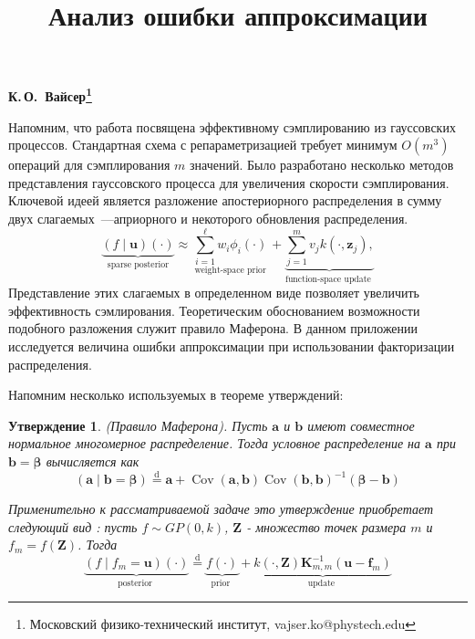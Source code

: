 \documentclass[12pt, twoside]{article}
\newcommand{\ba}{{\mathbf{a}}}
\newcommand{\bb}{{\mathbf{b}}}
\newcommand{\bZ}{{\mathbf{Z}}}
\newtheorem{corollary}{Утверждение}
\begin{document}
\title{\textbf{Анализ ошибки аппроксимации}}

\maketitle
\begin{center}
\bf
 К.\,О.~Вайсер\footnote{Московский физико-технический институт, vajser.ko@phystech.edu} 
\end{center}



Напомним, что работа посвящена эффективному сэмплированию из гауссовских процессов. Стандартная схема с репараметризацией требует минимум $O(m^3)$ операций для сэмплирования $m$ значений. Было разработано несколько методов представления гауссовского процесса для увеличения скорости сэмплирования. Ключевой идеей является разложение апостериорного распределения в сумму двух слагаемых~---априорного и некоторого обновления распределения. 
\begin{equation}
\underset{\text { sparse posterior }}{\underbrace{(f \mid \boldsymbol{u})(\cdot)}} \approx \underset{\text { weight-space prior }}{\sum_{i=1}^{\ell} w_{i} \phi_{i}(\cdot)}+\underbrace{\sum_{j=1}^{m} v_{j} k\left(\cdot, \boldsymbol{z}_{j}\right),}_{\text {function-space update }}
\end{equation}
Представление этих слагаемых в определенном виде позволяет увеличить эффективность сэмлирования. Теоретическим обоснованием возможности подобного разложения служит правило Маферона. В данном приложении исследуется величина ошибки аппроксимации при использовании факторизации распределения.  

Напомним несколько используемых в теореме утверждений:
\begin{corollary}


(Правило Маферона). Пусть $\ba$ и $\bb$ имеют совместное нормальное многомерное распределение. Тогда условное распределение на $\ba$ при $\bb = \mathbf{\beta}$ вычисляется как 
\begin{equation}
(\boldsymbol{a} \mid \boldsymbol{b}=\boldsymbol{\beta}) \stackrel{\mathrm{d}}{=} \boldsymbol{a}+\operatorname{Cov}(\boldsymbol{a}, \boldsymbol{b}) \operatorname{Cov}(\boldsymbol{b}, \boldsymbol{b})^{-1}(\boldsymbol{\beta}-\boldsymbol{b})
\end{equation}

Применительно к рассматриваемой задаче это утверждение приобретает следующий вид : пусть $f \sim GP(0, k)$, $\bZ$ - множество точек размера $m$ и $f_m = f(\bZ)$. Тогда 
\begin{equation}
    \underbrace{(f \mid f_m = \boldsymbol{u})(\cdot)}_{\text {posterior }} \stackrel{\mathrm{d}}{=} \underbrace{f(\cdot)}_{\text {prior }}+\underbrace{k(\cdot, \mathbf{Z}) \mathbf{K}_{m, m}^{-1}\left(\boldsymbol{u}-\boldsymbol{f}_{m}\right)}_{\text {update }}
\end{equation}
\end{corollary}
\end{document}
